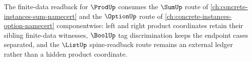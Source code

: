 The finite-data readback for $\ProdUp$ consumes the $\SumUp$ route of \autoref{ch:concrete-instances-sum-namecert} and the $\OptionUp$ route of \autoref{ch:concrete-instances-option-namecert} componentwise: left and right product coordinates retain their sibling finite-data witnesses, $\BoolUp$ tag discrimination keeps the endpoint cases separated, and the $\ListUp$ spine-readback route remains an external ledger rather than a hidden product coordinate.
